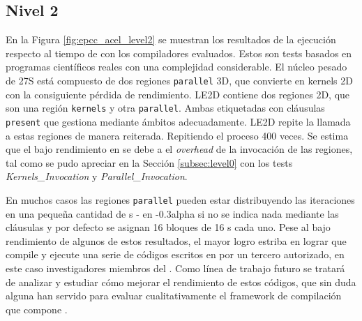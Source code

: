 \subsection{Nivel 2}
En la Figura \ref{fig:epcc_acel_level2} se muestran los resultados de la ejecución
respecto al tiempo de \PGI{} con los compiladores evaluados. Estos son tests 
basados en programas científicos reales con una complejidad considerable.
El núcleo pesado de 27S está compuesto de dos regiones \texttt{parallel} 3D, que
\accULL{} convierte en kernels 2D con la consiguiente pérdida de rendimiento.
LE2D contiene dos regiones 2D, que son una región \texttt{kernels} y otra 
\texttt{parallel}. Ambas etiquetadas con cláusulas \texttt{present} que \accULL{} 
gestiona mediante ámbitos adecuadamente. 
LE2D repite la llamada a estas regiones de manera reiterada. Repitiendo el proceso
400 veces. Se estima que el bajo rendimiento en \accULL{} se debe a el \textit{overhead}
de la invocación de las regiones, tal como se pudo apreciar en la Sección 
\ref{subsec:level0} con los tests \textit{Kernels\_Invocation} y \textit{Parallel\_Invocation}. %

En muchos casos las regiones \texttt{parallel} pueden estar distribuyendo las iteraciones 
en una pequeña cantidad de \thread{}s - en \accULL{}-0.3alpha si no se indica nada mediante 
las cláusulas \gang{} y \worker{} por defecto se asignan 16 bloques de 16 \thread{}s cada 
uno. Pese al bajo rendimiento de algunos de estos resultados, el mayor logro estriba en 
lograr que \accULL{} compile y ejecute una serie de códigos escritos en \OpenACC{} por un 
tercero autorizado, en este caso investigadores miembros del \epcc{}. Como línea de 
trabajo futuro se tratará de analizar y estudiar cómo mejorar el rendimiento de estos 
códigos, que sin duda alguna han servido para evaluar cualitativamente el framework
de compilación que compone \accULL{}.
